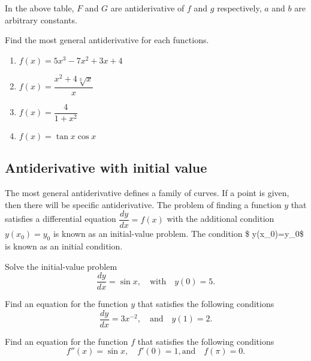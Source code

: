 In the above table, \(F\) and \(G\) are antiderivative of \(f\) and
\(g\) respectively, \(a\) and \(b\) are arbitrary constants.

\begin{example}

Find the most general antiderivative for each functions.

\begin{enumerate}
\item
  \(f(x)=5x^3-7x^2+3x+4\)
\item
  \(f(x)=\dfrac{x^2+4\sqrt[3]{x}}{x}\)
\item
  \(f(x)=\dfrac{4}{1+x^2}\)
\item
  \(f(x)=\tan x\cos x\)
\end{enumerate}

\end{example}

\hypertarget{antiderivative-with-initial-value}{%
\subsection{Antiderivative with initial
value}\label{antiderivative-with-initial-value}}

The most general antiderivative defines a family of curves. If a point
is given, then there will be specific antiderivative. The problem of
finding a function \(y\) that satisfies a differential equation
\(\dfrac{dy}{dx}=f(x)\) with the additional condition \(y(x_0)=y_0\) is
known as an initial-value problem. The condition \$ y(x\_0)=y\_0\$ is
known as an initial condition.

\begin{example}

Solve the initial-value problem
\[\dfrac{dy}{dx}=\sin x,\quad\text{with}\quad y(0)=5.\]

\end{example}
\vspace*{6\baselineskip}

\begin{example}

Find an equation for the function \(y\) that satisfies the following
conditions \[\dfrac{dy}{dx}=3x^{-2},\quad\text{and}\quad y(1)=2.\]

\end{example}
\vspace*{6\baselineskip}

\begin{example}

Find an equation for the function \(f\) that satisfies the following
conditions \[f''(x)=\sin x,\quad f'(0)=1, \text{and}\quad f(\pi)=0.\]

\end{example}
\vspace*{6\baselineskip}

